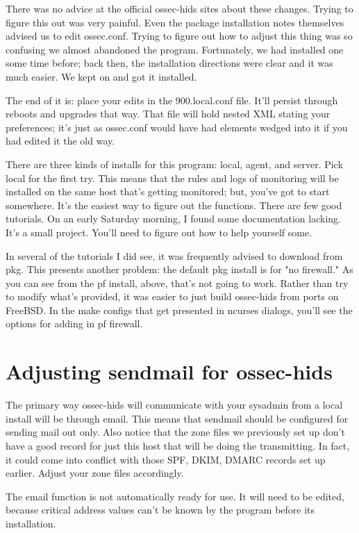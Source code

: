 There was no advice at the official ossec-hids sites about these changes.  Trying to figure this out was very painful.  Even the package installation notes themselves advised us to edit ossec.conf.  Trying to figure out how to adjust this thing was so confusing we almost abandoned the program.  Fortunately, we had installed one some time before; back then, the installation directions were clear and it was much easier.  We kept on and got it installed.

The end of it is:  place your edits in the 900.local.conf file.  It'll persist through reboots and upgrades that way.  That file will hold nested XML stating your preferences; it's just as ossec.conf would have had elements wedged into it if you had edited it the old way.

There are three kinds of installs for this program:  local, agent, and server.  Pick local for the first try.  This means that the rules and logs of monitoring will be installed on the same host that's getting monitored; but, you've got to start somewhere.  It's the easiest way to figure out the functions.  There are few good tutorials.  On an early Saturday morning, I found some documentation lacking.  It's a small project.  You'll need to figure out how to help yourself some.

In several of the tutorials I did see, it was frequently advised to download from pkg.  This presents another problem:  the default pkg install is for "no firewall."  As you can see from the pf install, above, that's not going to work.  Rather than try to modify what's provided, it was easier to just build ossec-hids from ports on FreeBSD.  In the make configs that get presented in ncurses dialogs, you'll see the options for adding in pf \gls{firewall}.

\section{Adjusting sendmail for ossec-hids}
The primary way ossec-hids will communicate with your sysadmin from a local install will be through email.  This means that sendmail should be configured for sending mail out only.  Also notice that the zone files we previously set up don't have a good record for just this host that will be doing the transmitting.  In fact, it could come into conflict with those SPF, DKIM, DMARC records set up earlier.  Adjust your zone files accordingly.

The email function is not automatically ready for use.  It will need to be edited, because critical address values can't be known by the program before its installation.  

